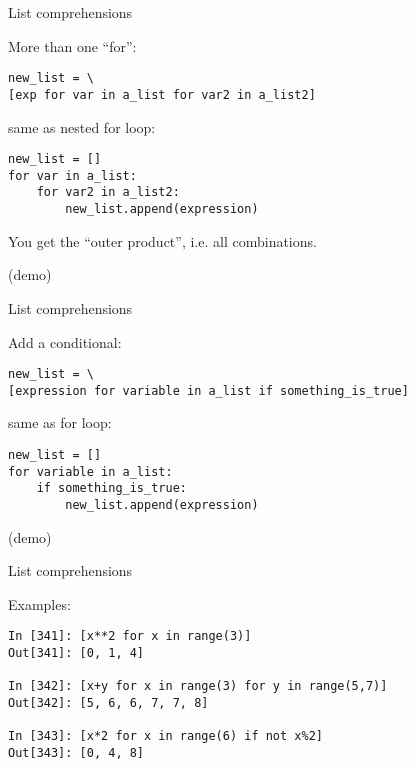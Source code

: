 \documentclass{beamer}
\begin{document}
\begin{frame}[fragile]{List comprehensions}

{\Large More than one ``for'':}

\begin{verbatim}
new_list = \
[exp for var in a_list for var2 in a_list2]
\end{verbatim}

{\Large same as nested for loop:}

\begin{verbatim}
new_list = []
for var in a_list:
    for var2 in a_list2:
        new_list.append(expression)
\end{verbatim}

{\large You get the ``outer product'', i.e. all combinations.}

\vfill
(demo)
\end{frame} 

\begin{frame}[fragile]{List comprehensions}

{\Large Add a conditional:}

\begin{verbatim}
new_list = \
[expression for variable in a_list if something_is_true]
\end{verbatim}

{\Large same as for loop:}

\begin{verbatim}
new_list = []
for variable in a_list:
    if something_is_true:
        new_list.append(expression)
\end{verbatim}

\vfill
(demo)
\end{frame} 



\begin{frame}[fragile]{List comprehensions}

{\Large Examples:}

\begin{verbatim}
In [341]: [x**2 for x in range(3)]
Out[341]: [0, 1, 4]

In [342]: [x+y for x in range(3) for y in range(5,7)]
Out[342]: [5, 6, 6, 7, 7, 8]

In [343]: [x*2 for x in range(6) if not x%2]
Out[343]: [0, 4, 8]
\end{verbatim}

\end{frame} 
\end{document}
